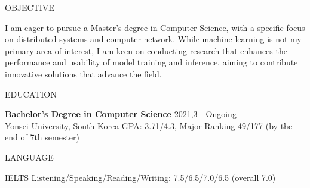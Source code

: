 \documentclass{resume} %
\begin{document}
\fontsize{8pt}{10pt}


\begin{rSection}{OBJECTIVE}

{I am eager to pursue a Master’s degree in Computer Science, with a specific
focus on distributed systems and computer network. While machine learning is not my
primary area of interest, I am keen on conducting research that enhances the
performance and usability of model training and inference, aiming to contribute
innovative solutions that advance the field.}


\end{rSection}

\begin{rSection}{EDUCATION}

{\bf Bachelor's Degree in Computer Science} \hfill {2021,3 - Ongoing}
\\ 
Yonsei University, South Korea GPA: 3.71/4.3, Major Ranking 49/177 (by the end of 7th semester)

\end{rSection}

\begin{rSection}{LANGUAGE}

IELTS Listening/Speaking/Reading/Writing: 7.5/6.5/7.0/6.5 (overall 7.0)

\end{rSection}
\end{document}
